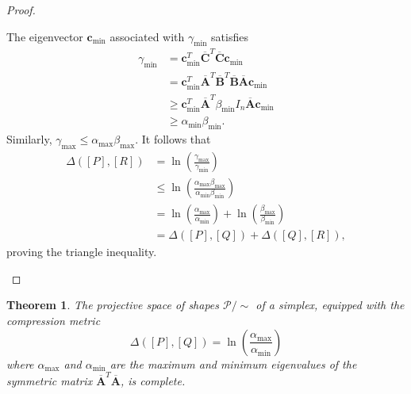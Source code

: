 \documentclass[a4paper, 12pt]{amsart}
\theoremstyle{plain}
\newtheorem{Thm}{Theorem}
\begin{document}
\begin{proof}
\begin{enumerate}
    The eigenvector $\mathbf{c}_{\min}$ associated with $\gamma_{\min}$ satisfies  
    \begin{align*}
        \gamma_{\min} &= \mathbf{c}_{\min}^T \overline{\mathbf{C}}^T \overline{\mathbf{C}} \mathbf{c}_{\min}\\
        &= \mathbf{c}_{\min}^T \overline{\mathbf{A}}^T \overline{\mathbf{B}}^T \overline{\mathbf{B}} \overline{\mathbf{A}} \mathbf{c}_{\min}\\
        &\geq \mathbf{c}_{\min}^T \overline{\mathbf{A}}^T \beta_{\min} I_n \overline{\mathbf{A}} \mathbf{c}_{\min}\\
        &\geq \alpha_{\min} \beta_{\min}.
    \end{align*}
    Similarly, $\gamma_{\max} \leq \alpha_{\max} \beta_{\max}$. It follows that  
    \begin{align*}
        \Delta([P], [R]) &= \ln \left(\frac{\gamma_{\max}}{\gamma_{\min}}\right)\\
        &\leq \ln \left(\frac{\alpha_{\max} \beta_{\max}}{\alpha_{\min} \beta_{\min}}\right)\\
        &= \ln \left(\frac{\alpha_{\max}}{\alpha_{\min}}\right) + \ln \left(\frac{\beta_{\max}}{\beta_{\min}}\right)\\
        &= \Delta([P], [Q]) + \Delta([Q], [R]),
    \end{align*}
    proving the triangle inequality.
\end{enumerate}
\end{proof}

\begin{Thm}\label{complete}
The projective space of shapes $\mathcal{P}/\sim$ of a simplex, equipped with the compression metric
$$
\Delta([P], [Q]) = \ln \left(\frac{\alpha_{\max}}{\alpha_{\min}}\right)
$$
where $\alpha_{\max}$ and $\alpha_{\min}$ are the maximum and minimum eigenvalues of the symmetric matrix $\overline{\mathbf{A}}^T \overline{\mathbf{A}}$, is complete.
\end{Thm}
\end{document}
